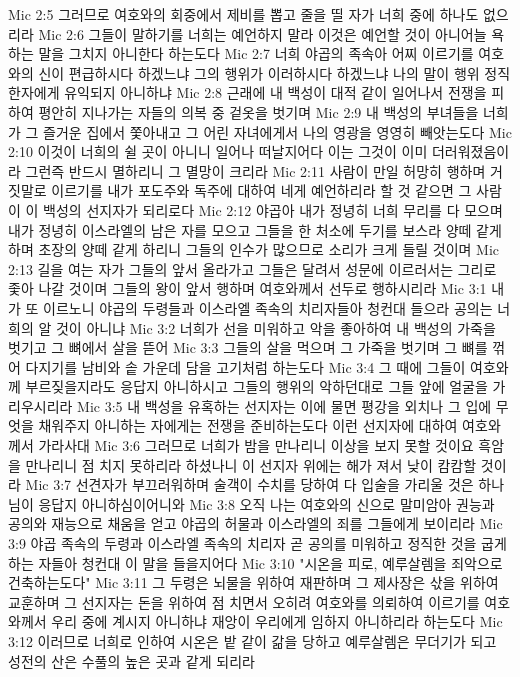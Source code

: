 Mic 2:5  그러므로 여호와의 회중에서 제비를 뽑고 줄을 띨 자가 너희 중에 하나도 없으리라
Mic 2:6  그들이 말하기를 너희는 예언하지 말라 이것은 예언할 것이 아니어늘 욕하는 말을 그치지 아니한다 하는도다
Mic 2:7  너희 야곱의 족속아 어찌 이르기를 여호와의 신이 편급하시다 하겠느냐 그의 행위가 이러하시다 하겠느냐 나의 말이 행위 정직한자에게 유익되지 아니하냐
Mic 2:8  근래에 내 백성이 대적 같이 일어나서 전쟁을 피하여 평안히 지나가는 자들의 의복 중 겉옷을 벗기며
Mic 2:9  내 백성의 부녀들을 너희가 그 즐거운 집에서 쫓아내고 그 어린 자녀에게서 나의 영광을 영영히 빼앗는도다
Mic 2:10  이것이 너희의 쉴 곳이 아니니 일어나 떠날지어다 이는 그것이 이미 더러워졌음이라 그런즉 반드시 멸하리니 그 멸망이 크리라
Mic 2:11  사람이 만일 허망히 행하며 거짓말로 이르기를 내가 포도주와 독주에 대하여 네게 예언하리라 할 것 같으면 그 사람이 이 백성의 선지자가 되리로다
Mic 2:12  야곱아 내가 정녕히 너희 무리를 다 모으며 내가 정녕히 이스라엘의 남은 자를 모으고 그들을 한 처소에 두기를 보스라 양떼 같게하며 초장의 양떼 같게 하리니 그들의 인수가 많으므로 소리가 크게 들릴 것이며
Mic 2:13  길을 여는 자가 그들의 앞서 올라가고 그들은 달려서 성문에 이르러서는 그리로 좇아 나갈 것이며 그들의 왕이 앞서 행하며 여호와께서 선두로 행하시리라
Mic 3:1  내가 또 이르노니 야곱의 두령들과 이스라엘 족속의 치리자들아 청컨대 들으라 공의는 너희의 알 것이 아니냐
Mic 3:2  너희가 선을 미워하고 악을 좋아하여 내 백성의 가죽을 벗기고 그 뼈에서 살을 뜯어
Mic 3:3  그들의 살을 먹으며 그 가죽을 벗기며 그 뼈를 꺾어 다지기를 남비와 솥 가운데 담을 고기처럼 하는도다
Mic 3:4  그 때에 그들이 여호와께 부르짖을지라도 응답지 아니하시고 그들의 행위의 악하던대로 그들 앞에 얼굴을 가리우시리라
Mic 3:5  내 백성을 유혹하는 선지자는 이에 물면 평강을 외치나 그 입에 무엇을 채워주지 아니하는 자에게는 전쟁을 준비하는도다 이런 선지자에 대하여 여호와께서 가라사대
Mic 3:6  그러므로 너희가 밤을 만나리니 이상을 보지 못할 것이요 흑암을 만나리니 점 치지 못하리라 하셨나니 이 선지자 위에는 해가 져서 낮이 캄캄할 것이라
Mic 3:7  선견자가 부끄러워하며 술객이 수치를 당하여 다 입술을 가리울 것은 하나님이 응답지 아니하심이어니와
Mic 3:8  오직 나는 여호와의 신으로 말미암아 권능과 공의와 재능으로 채움을 얻고 야곱의 허물과 이스라엘의 죄를 그들에게 보이리라
Mic 3:9  야곱 족속의 두령과 이스라엘 족속의 치리자 곧 공의를 미워하고 정직한 것을 굽게 하는 자들아 청컨대 이 말을 들을지어다
Mic 3:10  "시온을 피로, 예루살렘을 죄악으로 건축하는도다"
Mic 3:11  그 두령은 뇌물을 위하여 재판하며 그 제사장은 삯을 위하여 교훈하며 그 선지자는 돈을 위하여 점 치면서 오히려 여호와를 의뢰하여 이르기를 여호와께서 우리 중에 계시지 아니하냐 재앙이 우리에게 임하지 아니하리라 하는도다
Mic 3:12  이러므로 너희로 인하여 시온은 밭 같이 갊을 당하고 예루살렘은 무더기가 되고 성전의 산은 수풀의 높은 곳과 같게 되리라
